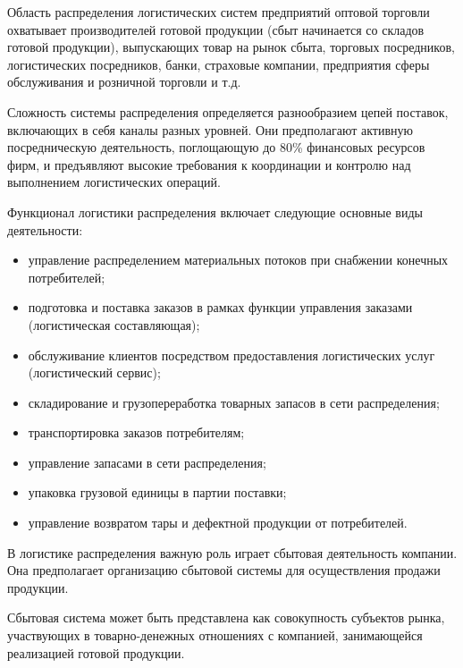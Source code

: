 Область распределения логистических систем предприятий оптовой торговли охватывает производителей  готовой продукции (сбыт начинается со складов готовой продукции), выпускающих товар на рынок сбыта, торговых посредников, логистических посредников, банки, страховые компании, предприятия сферы обслуживания и розничной торговли и т.д. 

Сложность системы распределения определяется разнообразием цепей поставок, включающих в себя каналы разных уровней.
Они предполагают активную посредническую деятельность, поглощающую до 80\% финансовых ресурсов фирм, и предъявляют высокие требования к координации и контролю над выполнением логистических операций.

Функционал логистики распределения включает следующие основные виды деятельности:
\begin{itemize}
	\item управление распределением материальных потоков при снабжении конечных потребителей;
	\item подготовка и поставка заказов в рамках функции управления заказами (логистическая составляющая);
	\item обслуживание клиентов посредством предоставления логистических услуг (логистический сервис);
	\item складирование и грузопереработка товарных запасов в сети распределения;
	\item транспортировка заказов потребителям;
	\item управление запасами в сети распределения;
	\item упаковка грузовой единицы в партии поставки;
	\item управление возвратом тары и дефектной продукции от потребителей.
\end{itemize}

В логистике распределения важную роль играет сбытовая деятельность компании.
Она предполагает организацию сбытовой системы для осуществления продажи продукции.

Сбытовая система может быть представлена как совокупность субъектов рынка, участвующих в товарно-денежных отношениях с компанией, занимающейся реализацией готовой продукции.


